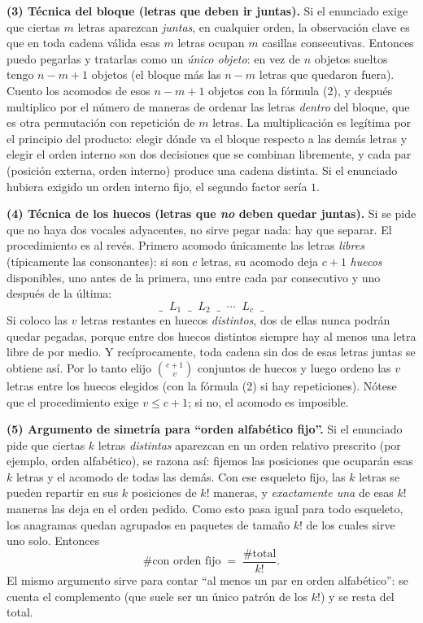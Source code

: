 \documentclass[11pt]{article}
\begin{document}
\begin{teo}
\medskip
\textbf{(3) Técnica del bloque (letras que deben ir juntas).} Si el enunciado exige que ciertas $m$ letras
aparezcan \emph{juntas}, en cualquier orden, la observación clave es que en toda cadena válida esas $m$
letras ocupan $m$ casillas consecutivas. Entonces puedo pegarlas y tratarlas como un \emph{único objeto}: en
vez de $n$ objetos sueltos tengo $n-m+1$ objetos (el bloque más las $n-m$ letras que quedaron fuera). Cuento
los acomodos de esos $n-m+1$ objetos con la fórmula (2), y después multiplico por el número de maneras de
ordenar las letras \emph{dentro} del bloque, que es otra permutación con repetición de $m$ letras. La
multiplicación es legítima por el principio del producto: elegir dónde va el bloque respecto a las demás
letras y elegir el orden interno son dos decisiones que se combinan libremente, y cada par (posición
externa, orden interno) produce una cadena distinta. Si el enunciado hubiera exigido un orden interno fijo,
el segundo factor sería $1$.

\medskip
\textbf{(4) Técnica de los huecos (letras que \emph{no} deben quedar juntas).} Si se pide que no haya dos
vocales adyacentes, no sirve pegar nada: hay que separar. El procedimiento es al revés. Primero acomodo
únicamente las letras \emph{libres} (típicamente las consonantes): si son $c$ letras, su acomodo deja
$c+1$ \emph{huecos} disponibles, uno antes de la primera, uno entre cada par consecutivo y uno después de la
última:
\[
\_\;\;L_1\;\;\_\;\;L_2\;\;\_\;\;\cdots\;\;L_c\;\;\_
\]
Si coloco las $v$ letras restantes en huecos \emph{distintos}, dos de ellas nunca podrán quedar pegadas,
porque entre dos huecos distintos siempre hay al menos una letra libre de por medio. Y recíprocamente, toda
cadena sin dos de esas letras juntas se obtiene así. Por lo tanto elijo $\binom{c+1}{v}$ conjuntos de huecos
y luego ordeno las $v$ letras entre los huecos elegidos (con la fórmula (2) si hay repeticiones). Nótese que
el procedimiento exige $v\le c+1$; si no, el acomodo es imposible.

\medskip
\textbf{(5) Argumento de simetría para ``orden alfabético fijo''.} Si el enunciado pide que ciertas $k$
letras \emph{distintas} aparezcan en un orden relativo prescrito (por ejemplo, orden alfabético), se razona
así: fijemos las posiciones que ocuparán esas $k$ letras y el acomodo de todas las demás. Con ese esqueleto
fijo, las $k$ letras se pueden repartir en sus $k$ posiciones de $k!$ maneras, y \emph{exactamente una} de
esas $k!$ maneras las deja en el orden pedido. Como esto pasa igual para todo esqueleto, los anagramas
quedan agrupados en paquetes de tamaño $k!$ de los cuales sirve uno solo. Entonces
\[
\#\text{con orden fijo} \;=\; \frac{\#\text{total}}{k!}.
\]
El mismo argumento sirve para contar ``al menos un par en orden alfabético'': se cuenta el complemento (que
suele ser un único patrón de los $k!$) y se resta del total.


\end{teo}
\end{document}
